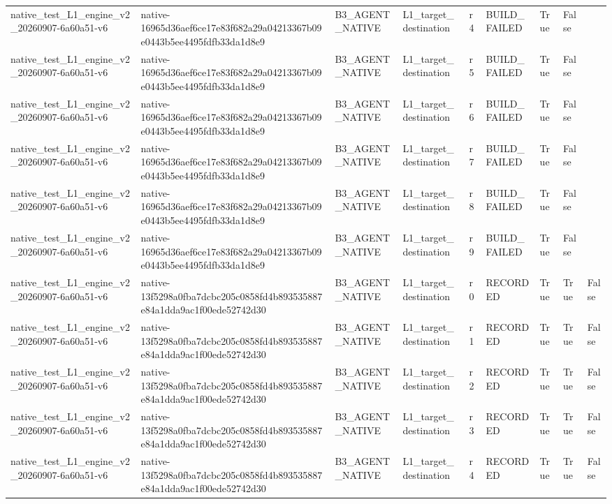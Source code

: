 \begin{tabular}{lllllllll}
native\_test\_L1\_engine\_v2\_20260907-6a60a51-v6 & native-16965d36aef6ce17e83f682a29a04213367b09e0443b5ee4495fdfb33da1d8e9 & B3\_AGENT\_NATIVE & L1\_target\_destination & r4 & BUILD\_FAILED & True & False &  \\
native\_test\_L1\_engine\_v2\_20260907-6a60a51-v6 & native-16965d36aef6ce17e83f682a29a04213367b09e0443b5ee4495fdfb33da1d8e9 & B3\_AGENT\_NATIVE & L1\_target\_destination & r5 & BUILD\_FAILED & True & False &  \\
native\_test\_L1\_engine\_v2\_20260907-6a60a51-v6 & native-16965d36aef6ce17e83f682a29a04213367b09e0443b5ee4495fdfb33da1d8e9 & B3\_AGENT\_NATIVE & L1\_target\_destination & r6 & BUILD\_FAILED & True & False &  \\
native\_test\_L1\_engine\_v2\_20260907-6a60a51-v6 & native-16965d36aef6ce17e83f682a29a04213367b09e0443b5ee4495fdfb33da1d8e9 & B3\_AGENT\_NATIVE & L1\_target\_destination & r7 & BUILD\_FAILED & True & False &  \\
native\_test\_L1\_engine\_v2\_20260907-6a60a51-v6 & native-16965d36aef6ce17e83f682a29a04213367b09e0443b5ee4495fdfb33da1d8e9 & B3\_AGENT\_NATIVE & L1\_target\_destination & r8 & BUILD\_FAILED & True & False &  \\
native\_test\_L1\_engine\_v2\_20260907-6a60a51-v6 & native-16965d36aef6ce17e83f682a29a04213367b09e0443b5ee4495fdfb33da1d8e9 & B3\_AGENT\_NATIVE & L1\_target\_destination & r9 & BUILD\_FAILED & True & False &  \\
native\_test\_L1\_engine\_v2\_20260907-6a60a51-v6 & native-13f5298a0fba7dcbc205c0858fd4b893535887e84a1dda9ac1f00ede52742d30 & B3\_AGENT\_NATIVE & L1\_target\_destination & r0 & RECORDED & True & True & False \\
native\_test\_L1\_engine\_v2\_20260907-6a60a51-v6 & native-13f5298a0fba7dcbc205c0858fd4b893535887e84a1dda9ac1f00ede52742d30 & B3\_AGENT\_NATIVE & L1\_target\_destination & r1 & RECORDED & True & True & False \\
native\_test\_L1\_engine\_v2\_20260907-6a60a51-v6 & native-13f5298a0fba7dcbc205c0858fd4b893535887e84a1dda9ac1f00ede52742d30 & B3\_AGENT\_NATIVE & L1\_target\_destination & r2 & RECORDED & True & True & False \\
native\_test\_L1\_engine\_v2\_20260907-6a60a51-v6 & native-13f5298a0fba7dcbc205c0858fd4b893535887e84a1dda9ac1f00ede52742d30 & B3\_AGENT\_NATIVE & L1\_target\_destination & r3 & RECORDED & True & True & False \\
native\_test\_L1\_engine\_v2\_20260907-6a60a51-v6 & native-13f5298a0fba7dcbc205c0858fd4b893535887e84a1dda9ac1f00ede52742d30 & B3\_AGENT\_NATIVE & L1\_target\_destination & r4 & RECORDED & True & True & False \\

\end{tabular}
